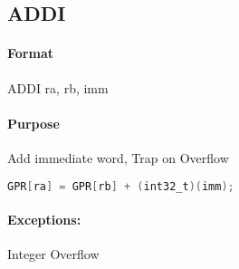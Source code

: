 \subsection{ADDI}


\paragraph{Format} ADDI ra, rb, imm

\paragraph{Purpose} Add immediate word, Trap on Overflow

\begin{lstlisting}[language=C]
    GPR[ra] = GPR[rb] + (int32_t)(imm);
\end{lstlisting}

\paragraph{Exceptions:} Integer Overflow
